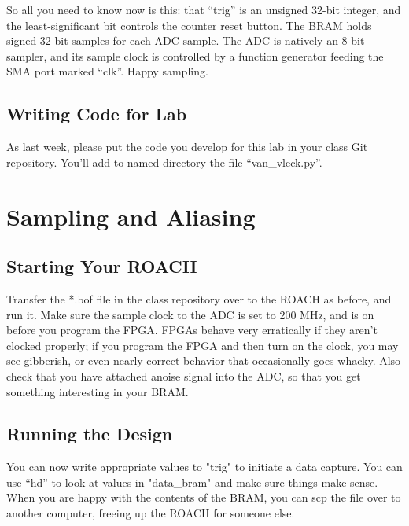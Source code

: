 \documentclass[11pt]{article}
\begin{document}
So all you need to know now is this: that ``trig'' is an unsigned 32-bit integer, and the least-significant bit
controls the counter reset button.  The BRAM holds signed 32-bit samples for each ADC sample.  The
ADC is natively an 8-bit sampler, and its sample clock is controlled by a function generator feeding the
SMA port marked ``clk''.  Happy sampling.

\subsection*{Writing Code for Lab}

As last week, please put the code you develop for this lab
in your class Git repository.  You'll add to named directory the file ``van\_vleck.py''.

\section{Sampling and Aliasing}

\subsection{Starting Your ROACH}

Transfer the *.bof file in the class repository over to the ROACH as before,
and run it.  Make sure the sample clock to the ADC is set to 200 MHz, and is
on before you program the FPGA.  FPGAs behave very erratically if they aren't
clocked properly; if you program the FPGA and then turn on the clock, you may
see gibberish, or even nearly-correct behavior that occasionally goes whacky.
Also check that you have attached anoise signal into the ADC, so that you get
something interesting in your BRAM.  

\subsection{Running the Design}

You can now write appropriate values to "trig" to initiate a data capture.  You
can use ``hd'' to look at values in "data\_bram" and make sure things make sense.
When you are happy with the contents of the BRAM, you can scp the file over to
another computer, freeing up the ROACH for someone else.
\end{document}
